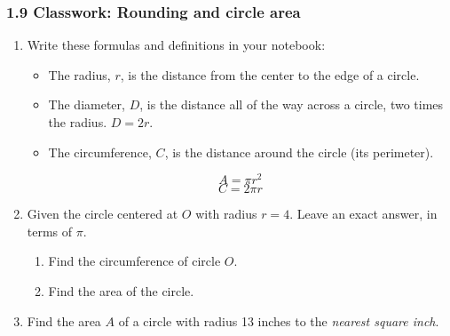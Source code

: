

\fancyhead[LE]{\thepage}



\subsubsection*{1.9 Classwork: Rounding and circle area}
\begin{enumerate}
\item Write these formulas and definitions in your notebook:
  \begin{itemize}
    \item The radius, $r$, is the distance from the center to the edge of a circle. 
    \item The diameter, $D$, is the distance all of the way across a circle, two times the radius. $D=2r$. 
    \item The circumference, $C$, is the distance around the circle (its perimeter).
  \end{itemize}
  \[A=\pi r^2\]
  \[C= 2\pi r\]

\item Given the circle centered at $O$ with radius $r=4$. Leave an exact answer, in terms of $\pi$.
  \begin{multicols}{2}
    \begin{enumerate}
      \item Find the circumference of circle $O$. %
      \item Find the area of the circle.\vspace{2cm}
    \end{enumerate}
  \end{multicols}

\item Find the area $A$ of a circle with radius 13 inches to the \emph{nearest square inch}. \vspace{2cm}


\end{enumerate}
